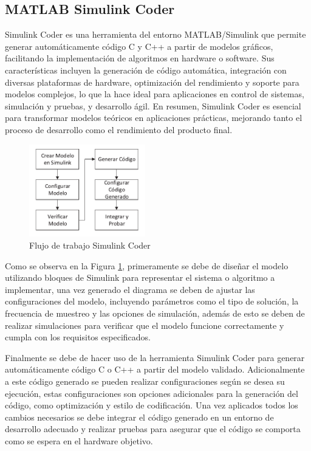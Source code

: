 \subsection{MATLAB Simulink Coder}

Simulink Coder es una herramienta del entorno MATLAB/Simulink que permite generar automáticamente código C y C++ a partir de modelos gráficos, facilitando la implementación de algoritmos en hardware o software. Sus características incluyen la generación de código automática, integración con diversas plataformas de hardware, optimización del rendimiento y soporte para modelos complejos, lo que la hace ideal para aplicaciones en control de sistemas, simulación y pruebas, y desarrollo ágil. En resumen, Simulink Coder es esencial para transformar modelos teóricos en aplicaciones prácticas, mejorando tanto el proceso de desarrollo como el rendimiento del producto final.


\begin{figure}[h!]
    \centering
    \includegraphics[width=0.45\textwidth]{fig/teorico/Flujo de trabajo simulink coder.pdf}
    \caption{Flujo de trabajo Simulink Coder}
    \label{fig:Simulink_coder_workflow}
\end{figure}

Como se observa en la Figura \ref{fig:Simulink_coder_workflow}, primeramente se debe de diseñar el modelo utilizando bloques de Simulink para representar el sistema o algoritmo a implementar, una vez generado el diagrama se deben de ajustar las configuraciones del modelo, incluyendo parámetros como el tipo de solución, la frecuencia de muestreo y las opciones de simulación, además de esto se deben de realizar simulaciones para verificar que el modelo funcione correctamente y cumpla con los requisitos especificados. 

Finalmente se debe de hacer uso de la herramienta Simulink Coder para generar automáticamente código C o C++ a partir del modelo validado. Adicionalmente a este código generado se pueden realizar configuraciones según se desea su ejecución, estas configuraciones son opciones adicionales para la generación del código, como optimización y estilo de codificación. Una vez aplicados todos los cambios necesarios se debe integrar el código generado en un entorno de desarrollo adecuado y realizar pruebas para asegurar que el código se comporta como se espera en el hardware objetivo.

